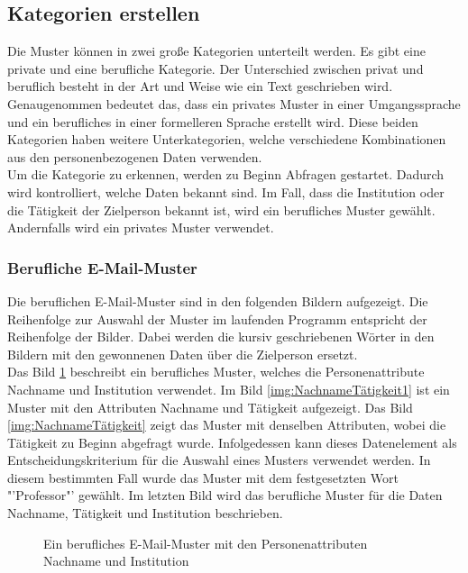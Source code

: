 	\subsection{Kategorien erstellen}
	Die Muster können in zwei große Kategorien unterteilt werden. Es gibt eine private und eine berufliche Kategorie. Der Unterschied zwischen privat und beruflich besteht in der Art und Weise wie ein Text geschrieben wird. Genaugenommen bedeutet das, dass ein privates Muster in einer Umgangssprache und ein berufliches in einer formelleren Sprache erstellt wird. Diese beiden Kategorien haben weitere Unterkategorien, welche verschiedene Kombinationen aus den personenbezogenen Daten verwenden.\\
	Um die Kategorie zu erkennen, werden zu Beginn Abfragen gestartet. Dadurch wird kontrolliert, welche Daten bekannt sind. Im Fall, dass die Institution oder die Tätigkeit der Zielperson bekannt ist, wird ein berufliches Muster gewählt. Andernfalls wird ein privates Muster verwendet.
	
		\subsubsection{Berufliche E-Mail-Muster}
		\label{subsubsec:beruflicheMuster}
		Die beruflichen E-Mail-Muster sind in den folgenden Bildern aufgezeigt. Die Reihenfolge zur Auswahl der Muster im laufenden Programm entspricht der Reihenfolge der Bilder. Dabei werden die kursiv geschriebenen Wörter in den Bildern mit den gewonnenen Daten über die Zielperson ersetzt.\\ 
		Das Bild \ref{img:NameInstitution} beschreibt ein berufliches Muster, welches die Personenattribute Nachname und Institution verwendet. Im Bild \ref{img:NachnameTätigkeit1} ist ein Muster mit den Attributen Nachname und Tätigkeit aufgezeigt. Das Bild \ref{img:NachnameTätigkeit} zeigt das Muster mit denselben Attributen, wobei die Tätigkeit zu Beginn abgefragt wurde. Infolgedessen kann dieses Datenelement als Entscheidungskriterium für die Auswahl eines Musters verwendet werden. In diesem bestimmten Fall wurde das Muster mit dem festgesetzten Wort "'Professor"' gewählt. Im letzten Bild wird das berufliche Muster für die Daten Nachname, Tätigkeit und Institution beschrieben.
			\begin{figure}[h!]
				\label{img:NameInstitution}
				\caption{Ein berufliches E-Mail-Muster mit den Personenattributen Nachname und Institution }
			\end{figure}
		
